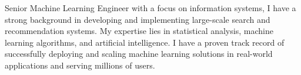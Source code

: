 \vrule
\begin{cvparagraph}
Senior Machine Learning Engineer with a focus on information systems, I have a strong background in developing and implementing large-scale search and recommendation systems. My expertise lies in statistical analysis, machine learning algorithms, and artificial intelligence. I have a proven track record of successfully deploying and scaling machine learning solutions in real-world applications and serving millions of users.
\end{cvparagraph}